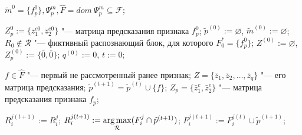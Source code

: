 	\Require $\tilde m^0=\{f_p^0\}, \Psi_p^m, \hat F=dom\ \Psi_p^m\subseteq \mathcal F$;
	
	\State $Z_p^0 := \{\bar z_1^{c0},\bar z_2^{e0}\}$ "--- матрица предсказания признака $f_p^0$;
	\State $\tilde p^{(0)} := \varnothing$, $\tilde m^{(0)} := \varnothing$;
	\State $R_0\not\in\mathcal R$ "--- фиктивный распознающий блок, для которого $F_0^*=\{f_p^0\}$;
	\State $Z^{(0)} := \varnothing$, $Z_p^{(0)} := \{\bar 0, \bar 0\}$;
	\State $q^{(0)} := 0$, $t := 0$;
	
		\State $f\in\hat F$ "--- первый не рассмотренный ранее признак; 
		\State $Z=\{\bar z_1,\bar z_2,\dots,\bar z_q\}$ "--- его матрица предсказания;
		\label{alst:find_m}
			\State $\tilde p^{(t+1)}=\tilde p^{(t)}\cup\{f\}$;
			\State $Z_p=\{\bar z_1^{c},\bar z_2^{e}\}$ "--- матрица предсказания признака $f_p$;
	
				\State $R_i^{j(t+1)}:=R_i^j$;
			\Else
				\State $R_i^{j(t+1)}:=\operatorname*{arg\,max}\limits_{\mathcal R} (F_i^j\cap\tilde p^{(t+1)})$;
				\State $F_i^{j(t+1)}:=F_i^{j(t)}\cup\tilde p^{(t+1)}$;
			\EndIf

